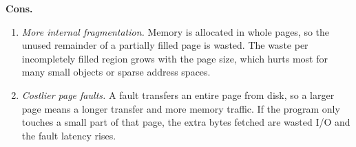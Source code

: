 \textbf{Cons.}
\begin{enumerate}
  \item \emph{More internal fragmentation.} Memory is allocated in whole pages, so
    the unused remainder of a partially filled page is wasted. The waste per
    incompletely filled region grows with the page size, which hurts most for many
    small objects or sparse address spaces.
  \item \emph{Costlier page faults.} A fault transfers an entire page from disk, so
    a larger page means a longer transfer and more memory traffic. If the program
    only touches a small part of that page, the extra bytes fetched are wasted I/O
    and the fault latency rises.
\end{enumerate}
